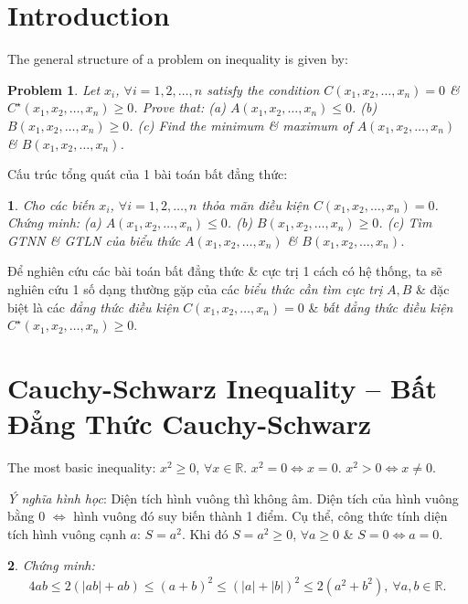 \documentclass{article}
\newtheorem{baitoan}{}
\newtheorem{problem}{Problem}
\begin{document}

\section{Introduction}
The general structure of a problem on inequality is given by:

\begin{problem}
	Let $x_i$, $\forall i = 1,2,\ldots,n$ satisfy the condition $C(x_1,x_2,\ldots,x_n) = 0$ \& $C^\star(x_1,x_2,\ldots,x_n)\ge0$. Prove that: (a) $A(x_1,x_2,\ldots,x_n)\le0$. (b) $B(x_1,x_2,\ldots,x_n)\ge0$. (c) Find the minimum \& maximum of $A(x_1,x_2,\ldots,x_n)$ \& $B(x_1,x_2,\ldots,x_n)$.
\end{problem}
Cấu trúc tổng quát của 1 bài toán bất đẳng thức:

\begin{baitoan}
	Cho các biến $x_i$, $\forall i = 1,2,\ldots,n$ thỏa mãn điều kiện $C(x_1,x_2,\ldots,x_n) = 0$. Chứng minh: (a) $A(x_1,x_2,\ldots,x_n)\le0$. (b) $B(x_1,x_2,\ldots,x_n)\ge0$. (c) Tìm {\rm GTNN} \& {\rm GTLN} của biểu thức $A(x_1,x_2,\ldots,x_n)$ \& $B(x_1,x_2,\ldots,x_n)$.
\end{baitoan}
Để nghiên cứu các bài toán bất đẳng thức \& cực trị 1 cách có hệ thống, ta sẽ nghiên cứu 1 số dạng thường gặp của các \textit{biểu thức cần tìm cực trị} $A,B$ \& đặc biệt là các \textit{đẳng thức điều kiện} $C(x_1,x_2,\ldots,x_n) = 0$ \& \textit{bất đẳng thức điều kiện} $C^\star(x_1,x_2,\ldots,x_n)\ge0$.


\section{Cauchy-Schwarz Inequality -- Bất Đẳng Thức Cauchy-Schwarz}
The most basic inequality: $x^2\ge0$, $\forall x\in\mathbb{R}$. $x^2 = 0\Leftrightarrow x = 0$. $x^2 > 0\Leftrightarrow x\ne0$.

\textit{Ý nghĩa hình học}: Diện tích hình vuông thì không âm. Diện tích của hình vuông bằng 0 $\Leftrightarrow$ hình vuông đó suy biến thành 1 điểm. Cụ thể, công thức tính diện tích hình vuông cạnh $a$: $S = a^2$. Khi đó $S = a^2\ge0$, $\forall a\ge0$ \& $S = 0\Leftrightarrow a = 0$.

\begin{baitoan}
	Chứng minh:
	\begin{align}
		\label{1}
		4ab\le2(|ab| + ab)\le(a + b)^2\le(|a| + |b|)^2\le2(a^2 + b^2),\ \forall a,b\in\mathbb{R}.
	\end{align}
\end{baitoan}
\end{document}
